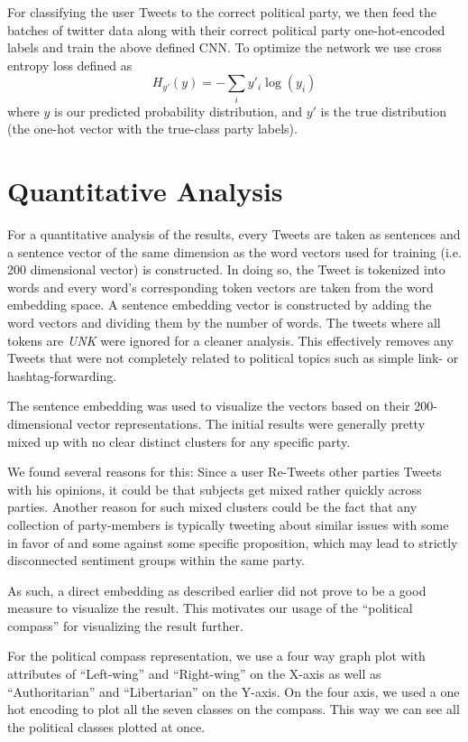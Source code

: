 \documentclass[10pt, oneside]{article}
\begin{document}
\begin{multicols}{2}
For classifying the user Tweets to the correct political party, we then feed the batches of twitter data along with their correct political party one-hot-encoded labels and train the above defined CNN. To optimize the network we use cross entropy loss defined as
\begin{equation}
	H_{y'}(y) = - \sum_{i} y'_{i} \log (y_{i})
\end{equation}
where $y$ is our predicted probability distribution, and $y'$ is the true distribution (the one-hot vector with the true-class party labels). 


\section{Quantitative Analysis}

For a quantitative analysis of the results, every Tweets are taken as sentences and a sentence vector of the same dimension as the word vectors used for training (i.e. 200 dimensional vector) is constructed. In doing so, the Tweet is tokenized into words and every word's corresponding token vectors are taken from the word embedding space. A sentence embedding vector is constructed by adding the word vectors and dividing them by the number of words. The tweets where all tokens are \emph{UNK} were ignored for a cleaner analysis. This effectively removes any Tweets that were not completely related to political topics such as simple link- or hashtag-forwarding. 

The sentence embedding was used to visualize the vectors based on their 200-dimensional vector representations. The initial results were generally pretty mixed up with no clear distinct clusters for any specific party.

We found several reasons for this:
Since a user Re-Tweets other parties Tweets with his opinions, it could be that subjects get mixed rather quickly across parties.
Another reason for such mixed clusters could be the fact that any collection of party-members is typically tweeting about similar issues with some in favor of and some against some specific proposition, which may lead to strictly disconnected sentiment groups within the same party.

As such, a direct embedding as described earlier did not prove to be a good measure to visualize the result. This motivates our usage of the ``political compass'' \cite{PoliticalCompass2017} for visualizing the result further. 

For the political compass representation, we use a four way graph plot with attributes of ``Left-wing'' and ``Right-wing'' on the X-axis as well as  ``Authoritarian'' and ``Libertarian'' on the Y-axis. On the four axis, we used a one hot encoding to plot all the seven classes on the compass. This way we can see all the political classes plotted at once.


\end{multicols}
\end{document}
